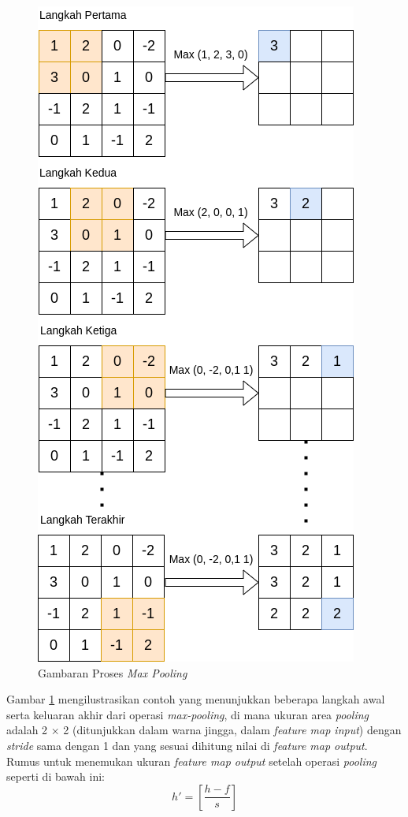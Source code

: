 \begin{figure}[h!]
	\centering
	\includegraphics[scale=0.25]{gambar/max-pooling.png}
	\caption{Gambaran Proses \textit{Max Pooling}}
	\label{fig:max-pooling}
\end{figure}

Gambar \ref{fig:max-pooling} mengilustrasikan contoh yang menunjukkan beberapa langkah awal serta keluaran akhir dari operasi \textit{max-pooling}, di mana ukuran area \textit{pooling} adalah 2 × 2 (ditunjukkan dalam warna jingga, dalam \textit{feature map input}) dengan \textit{stride} sama dengan 1 dan yang sesuai dihitung nilai di \textit{feature map output}. Rumus untuk menemukan ukuran \textit{feature map output} setelah operasi \textit{pooling} seperti di bawah ini:
\begin{equation}
	h'= \left[ \frac{h-f}{s} \right]
\end{equation}


